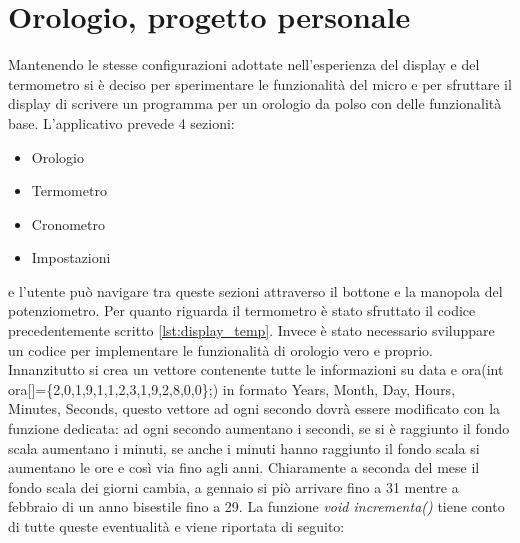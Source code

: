 \documentclass[main.tex]{subfiles}
\begin{document}
\section{Orologio, progetto personale}
Mantenendo le stesse configurazioni adottate nell'esperienza del display e del termometro si è deciso per sperimentare le funzionalità del micro e per sfruttare il display di scrivere un programma per un orologio da polso con delle funzionalità base. L'applicativo prevede 4 sezioni:
\begin{itemize}
    \item Orologio
    \item Termometro
    \item Cronometro
    \item Impostazioni
\end{itemize}
e l'utente può navigare tra queste sezioni attraverso il bottone e la manopola del potenziometro. 
Per quanto riguarda il termometro è stato sfruttato il codice precedentemente scritto \ref{lst:display_temp}. Invece è stato necessario sviluppare un codice per implementare le funzionalità di orologio vero e proprio. Innanzitutto si crea un vettore contenente tutte le informazioni su data e ora(int ora[]=\{2,0,1,9,1,1,2,3,1,9,2,8,0,0\};) in formato Years, Month, Day, Hours, Minutes, Seconds, questo vettore ad ogni secondo dovrà essere modificato con la funzione dedicata: ad ogni secondo aumentano i secondi, se si è raggiunto il fondo scala aumentano i minuti, se anche i minuti hanno raggiunto il fondo scala si aumentano le ore e così via fino agli anni. Chiaramente a seconda del mese il fondo scala dei giorni cambia, a gennaio si piò arrivare fino a 31 mentre a febbraio di un anno bisestile fino a 29. La funzione \textit{void incrementa()} tiene conto di tutte queste eventualità e viene riportata di seguito:
\end{document}
